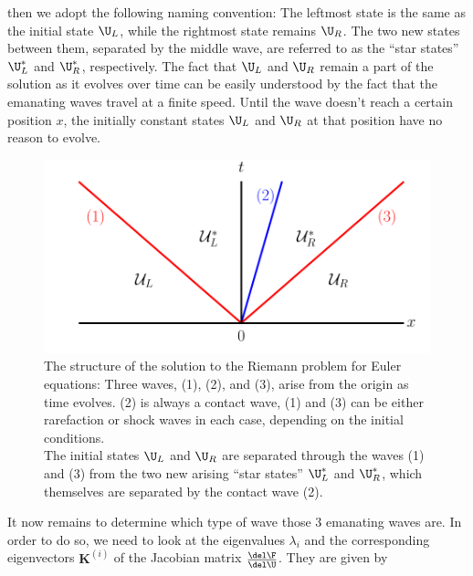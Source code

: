 then we adopt the following naming convention:  The leftmost state is the same as the initial
state $\U_L$, while the rightmost state remains $\U_R$. The two new states between them, separated
by the middle wave, are referred to as the ``star states'' $\U_L^*$ and $\U_R^*$, respectively.
The fact that $\U_L$ and $\U_R$ remain a part of the solution as it evolves over time can be easily
understood by the fact that the emanating waves travel at a finite speed. Until the wave doesn't
reach a certain position $x$, the initially constant states $\U_L$ and $\U_R$ at that position have
no reason to evolve.


\begin{figure}[H]
    \centering
    \includegraphics[width=.8\linewidth]{./figures/FV/riemann_solution.pdf}%
    \caption[Structure of the solution to the Riemann problem for Euler equations]{
The structure of the solution to the Riemann problem for Euler equations:
Three waves, (1), (2), and (3), arise from the origin as time evolves.
(2) is always a contact wave, (1) and (3) can be either rarefaction or shock waves in each
case, depending on the initial conditions.\\
The initial states $\U_L$ and $\U_R$ are separated through the waves (1) and (3) from the
two new arising ``star states'' $\U_L^*$ and $\U_R^*$, which themselves are separated by the contact
wave (2).
    }
    \label{fig:riemann-solution}
\end{figure}


It now remains to determine which type of wave those 3 emanating waves are. In order to do so, we
need to look at the eigenvalues $\lambda_i$  and the corresponding eigenvectors
$\mathbf{K}^{(i)}$ of the Jacobian matrix  $\frac{\del \F}{\del \U}$. They are given by

